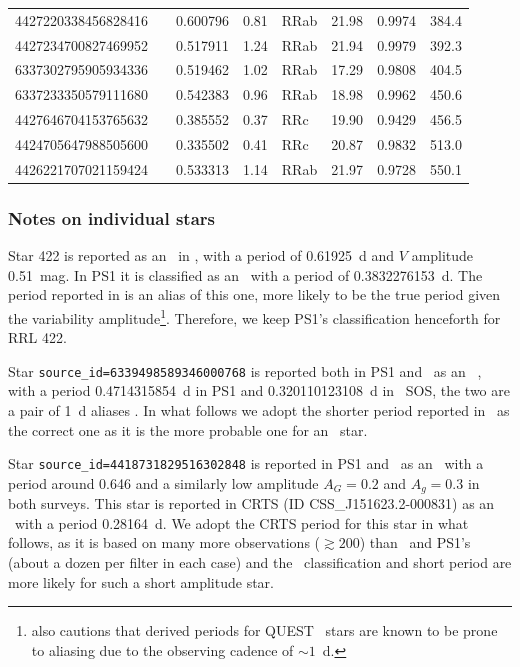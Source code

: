 \documentclass[twocolumn]{aastex63}
\begin{document}
\begin{table}[t]
\begin{footnotesize}
\begin{tabular}{llllllll}
4427220338456828416 &     & 0.600796& 0.81 & RRab & 21.98 & 0.9974 & 384.4 \\
4427234700827469952 &     & 0.517911& 1.24 & RRab & 21.94 & 0.9979 & 392.3 \\
6337302795905934336 &     & 0.519462& 1.02 & RRab & 17.29 & 0.9808 & 404.5 \\
6337233350579111680 &     & 0.542383& 0.96 & RRab & 18.98 & 0.9962 & 450.6 \\
4427646704153765632 &     & 0.385552& 0.37 & RRc  & 19.90 & 0.9429 & 456.5 \\
4424705647988505600 &     & 0.335502& 0.41 & RRc  & 20.87 & 0.9832 & 513.0 \\
4426221707021159424 &     & 0.533313& 1.14 & RRab & 21.97 & 0.9728 & 550.1 \\
\bottomrule
\end{tabular}
\end{footnotesize}
\end{table}

\subsubsection{Notes on individual stars}

Star 422 is reported as an \rrc~in \citet{Vivas2004}, with a period of 0.61925~d and $V$ amplitude 0.51~mag. In PS1 it is classified as an \rrc~with a period of 0.3832276153~d. The period reported in \citet{Vivas2004} is an alias of this one, more likely to be the true period given the variability amplitude\footnote{\citet{Vivas2004} also cautions that derived periods for QUEST \rrc~stars are known to be prone to aliasing due to the observing cadence of $\sim1$~d.}. Therefore, we keep PS1's classification henceforth for RRL 422.  

Star \verb+source_id=6339498589346000768+ is reported both in PS1 and \Gaia~as an \rrc~, with a period 0.4714315854~d in PS1 and 0.320110123108~d in \Gaia~SOS, the two are a pair of 1~d aliases \citep[see e.g.]{Lafler1965}. In what follows we adopt the shorter period reported in \Gaia~as the correct one as it is the more probable one for an \rrc~star.

Star \verb+source_id=4418731829516302848+ is reported in PS1 and \Gaia~as an \rrab~with a period around 0.646 and a similarly low amplitude $A_G=0.2$ and $A_g=0.3$ in both surveys. This star is reported in CRTS \citep{Drake2014} (ID CSS\_J151623.2-000831) as an \rrc~with a period 0.28164~d. We adopt the CRTS period for this star in what follows, as it is based on many more observations ($\gtrsim200$) than \Gaia~and PS1's (about a dozen per filter in each case) and the \rrc~classification and short period are more likely for such a short amplitude star.  
\end{document}
